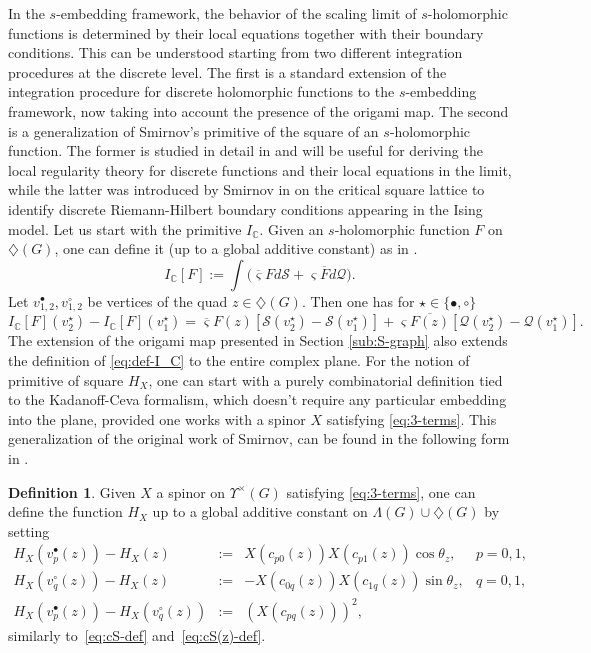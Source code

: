 \documentclass[reqno]{amsart}
\numberwithin{equation}{section}
\theoremstyle{definition}
\newtheorem{definition}[theo]{Definition}
\theoremstyle{remark}
\newcommand\cQ{\mathcal{Q}}
\newcommand\cS{\mathcal{S}}
\newcommand\Dm{\diamondsuit}
\begin{document}
In the $s$-embedding framework, the behavior of the scaling limit of $s$-holomorphic functions is determined by their local equations together with their boundary conditions. This can be understood starting from two different integration procedures at the discrete level. The first is a standard extension of the integration procedure for discrete holomorphic functions to the $s$-embedding framework, now taking into account the presence of the origami map. The second is a generalization of Smirnov's primitive of the square of an $s$-holomorphic function. The former is studied in detail in \cite[Proposition~6.15]{CLR1} and will be useful for deriving the local regularity theory for discrete functions and their local equations in the limit, while the latter was introduced by Smirnov in \cite{Smirnov_Ising} on the critical square lattice to identify discrete Riemann-Hilbert boundary conditions appearing in the Ising model. Let us start with the primitive $I_{\mathbb{C}}$. Given an $s$-holomorphic function $F$ on $\diamondsuit(G)$, one can define it (up to a global additive constant) as in \cite[Section~2.3]{Che20}.
\begin{equation}\label{eq:def-I_C}
I_{\mathbb{C}}[F]:= \int \big( \overline{\varsigma}Fd\cS + \varsigma \overline{F} d\cQ \big).
\end{equation}
Let $v_{1,2}^{\bullet}, v_{1,2}^{\circ}$ be vertices of the quad $z\in \diamondsuit(G)$. Then one has for $\star \in \{ \bullet, \circ \} $
\begin{equation}
I_{\mathbb{C}}[F](v_{2}^{\star}) - I_{\mathbb{C}}[F](v_{1}^{\star}) = \overline{\varsigma} F(z) [ \cS(v_{2}^{\star}) - \cS(v_{1}^{\star})] + \varsigma \overline{F(z)}[ \cQ(v_{2}^{\star}) - \cQ(v_{1}^{\star})].
\end{equation}
The extension of the origami map presented in Section \ref{sub:S-graph} also extends the definition of \eqref{eq:def-I_C} to the entire complex plane. For the notion of primitive of square $H_X$, one can start with a purely combinatorial definition tied to the Kadanoff-Ceva formalism, which doesn't require any particular embedding into the plane, provided one works with a spinor $X$ satisfying \eqref{eq:3-terms}. This generalization of the original work of Smirnov, can be found in the following form in \cite[Definition 2.8]{Che20}.
\begin{definition}
\label{def:HX-def} Given $X$ a spinor on $\Upsilon^\times(G)$ satisfying \eqref{eq:3-terms}, one can define the function $H_X$ up to a global additive constant on $\Lambda(G)\cup\Dm(G)$ by setting
\begin{equation}
\label{eq:HX-def}
\begin{array}{rcll}
H_X(v^\bullet_p(z))-H_X(z)&:=&X(c_{p0}(z))X(c_{p1}(z))\cos\theta_z, & p=0,1,\\[2pt]
H_X(v^\circ_q(z))-H_X(z)&:=&-X(c_{0q}(z))X(c_{1q}(z))\sin\theta_z,& q=0,1,\\[2pt]
H_X(v^\bullet_p(z))-H_X(v^\circ_q(z))&:=&(X(c_{pq}(z)))^2,
\end{array}
\end{equation}
similarly to~\eqref{eq:cS-def} and~\eqref{eq:cS(z)-def}.
\end{definition}
\end{document}
